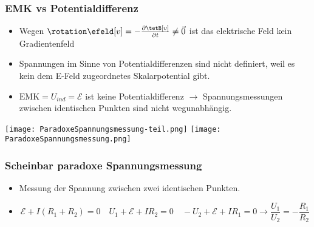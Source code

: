 \begin{frame}
  \frametitle{EMK vs Potentialdifferenz}
  \begin{itemize}[<+->]
  \item Wegen $\rotation \efeld[v] = -\frac{\partial \tetB[v]}{\partial t} \ne \vec{0}$ ist das elektrische Feld \alert{kein Gradientenfeld}
  \item Spannungen im Sinne von \alert{Potentialdifferenzen} sind \alert{nicht definiert}, weil es kein dem E-Feld zugeordnetes Skalarpotential gibt.
    \item $\text{EMK} = U_{ind}=\mathcal{E}$ ist \alert{keine Potentialdifferenz} $\to$ Spannungsmessungen zwischen identischen Punkten sind \alert{nicht wegunabhängig.}
    \end{itemize}\pause
    
  \texttt{[image: ParadoxeSpannungsmessung-teil.png]}\hspace*{1cm}\pause
  \texttt{[image: ParadoxeSpannungsmessung.png]}
\end{frame}

\begin{frame}
  \frametitle{Scheinbar paradoxe Spannungsmessung}
  \begin{itemize}[<+->]
  \item Messung der Spannung zwischen zwei identischen Punkten.
  \item
    $$
    \mathcal{E} + I (R_1+R_2)= 0 \quad U_1+\mathcal{E} + I R_2 = 0 \quad -U_2+\mathcal{E} + I R_1 = 0 \to \boxed{\frac{U_1}{U_2} = -\frac{R_1}{R_2}} 
    $$
  \end{itemize}
\end{frame}

